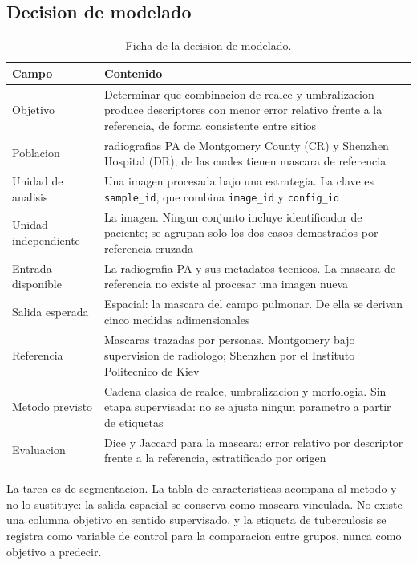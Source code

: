 \documentclass[11pt,a4paper]{article}
\begin{document}
\subsection{Decision de modelado}

\begin{table}[H]
\centering
\small
\caption{Ficha de la decision de modelado.}
\begin{tabular}{@{}p{4.0cm}p{10.5cm}@{}}
\toprule
\textbf{Campo} & \textbf{Contenido} \\
\midrule
Objetivo & Determinar que combinacion de realce y umbralizacion produce descriptores con menor error relativo frente a la referencia, de forma consistente entre sitios \\
\addlinespace
Poblacion & \NImagenesTotal{} radiografias PA de Montgomery County (CR) y Shenzhen Hospital (DR), de las cuales \NConMascara{} tienen mascara de referencia \\
\addlinespace
Unidad de analisis & Una imagen procesada bajo una estrategia. La clave es \texttt{sample\_id}, que combina \texttt{image\_id} y \texttt{config\_id} \\
\addlinespace
Unidad independiente & La imagen. Ningun conjunto incluye identificador de paciente; se agrupan solo los dos casos demostrados por referencia cruzada \\
\addlinespace
Entrada disponible & La radiografia PA y sus metadatos tecnicos. La mascara de referencia no existe al procesar una imagen nueva \\
\addlinespace
Salida esperada & Espacial: la mascara del campo pulmonar. De ella se derivan cinco medidas adimensionales \\
\addlinespace
Referencia & Mascaras trazadas por personas. Montgomery bajo supervision de radiologo; Shenzhen por el Instituto Politecnico de Kiev \\
\addlinespace
Metodo previsto & Cadena clasica de realce, umbralizacion y morfologia. Sin etapa supervisada: no se ajusta ningun parametro a partir de etiquetas \\
\addlinespace
Evaluacion & Dice y Jaccard para la mascara; error relativo por descriptor frente a la referencia, estratificado por origen \\
\bottomrule
\end{tabular}
\end{table}

La tarea es de segmentacion. La tabla de caracteristicas acompana al metodo y
no lo sustituye: la salida espacial se conserva como mascara vinculada. No
existe una columna objetivo en sentido supervisado, y la etiqueta de
tuberculosis se registra como variable de control para la comparacion entre
grupos, nunca como objetivo a predecir.
\end{document}
